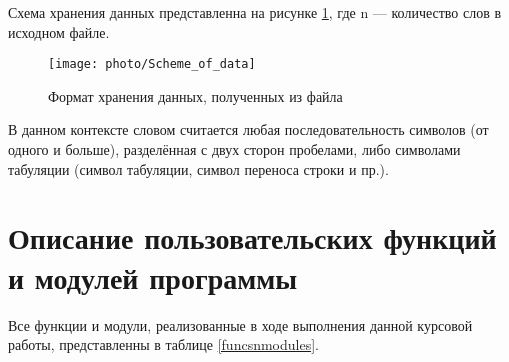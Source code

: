 \documentclass[12pt,a4paper]{article}%
\begin{document}
Схема хранения данных представленна на рисунке \ref{data_scheme}, где n --- количество слов в исходном файле.
\begin{figure}[h!]
	\centering
	\texttt{[image: photo/Scheme\_of\_data]}
	\caption{Формат хранения данных, полученных из файла}
	\label{data_scheme}
	
\end{figure}

В данном контексте словом считается любая последовательность символов (от одного и больше), разделённая с двух сторон пробелами, либо символами табуляции (символ табуляции, символ переноса строки и пр.).
\newpage
\section{Описание пользовательских функций и модулей программы}
\setcounter{figure}{0}
\begin{comment}
В этом разделе отчёта нужно будет привести краткое описание
разработанных модулей программы, а также пользовательских функций и
методов в следующем формате (табл. 1):
Табл. 2 Описание модулей, структур/классов, функций/методов программы
Имя
Имя
Назначение
Параметры
Возвращаемое
модуля структуры/класса
для функции
функцией
или функции
значение
\end{comment}

Все функции и модули, реализованные в ходе выполнения данной курсовой работы, представленны в таблице \ref{funcsnmodules}.
\end{document}
